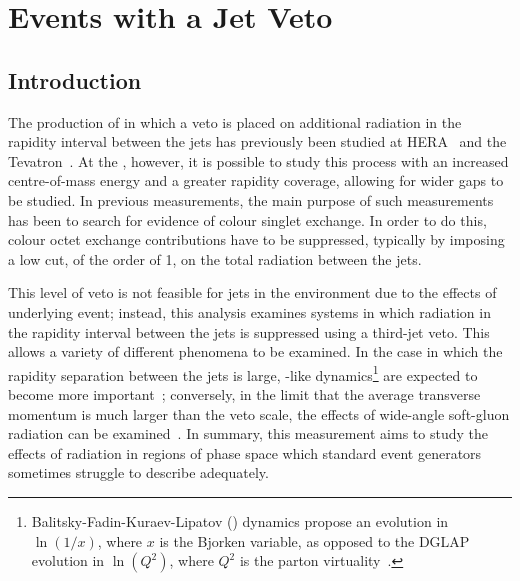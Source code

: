 \chapter{\Dijet Events with a Jet Veto}
\label{chap:gbj}


\section{Introduction}
The production of  in which a veto is placed on additional radiation in
the rapidity interval between the jets has previously been studied at HERA~\cite{ZEUS:1996:RapidityGaps,HERA:2002:RapidityGaps,ZEUS:2006:RapidityGaps}
and the Tevatron~\cite{D0:1994:RapidityGaps,CDF:1995:RapidityGaps,CDF:1998:RapidityGaps,D0:1998:ColorSinglet,CDF:1998:ColorSinglet}.
At the \LHC, however, it is possible to study this process with an increased centre-of-mass
energy and a greater rapidity coverage, allowing for wider gaps to be studied. In
previous measurements, the main purpose of such measurements has been to search for evidence of colour
singlet exchange. In order to do this, colour octet exchange contributions have to
be suppressed, typically by imposing a low cut, of the order of \unit{1}{\GeV},
on the total radiation between the jets.

This level of veto is not feasible for jets in the \ATLAS environment due to the effects of underlying event;
instead, this analysis examines \dijet systems in which radiation in the rapidity interval between the
jets is suppressed using a third-jet veto. This allows a variety of different \QCD
phenomena to be examined. In the case in which the rapidity separation between the
jets is large, \BFKL-like dynamics\footnote{Balitsky-Fadin-Kuraev-Lipatov (\BFKL) dynamics propose an evolution
in $\ln{(1/x)}$, where $x$ is the Bjorken variable, as opposed to the DGLAP
evolution in $\ln{(Q^2)}$, where $Q^2$ is the parton virtuality~\cite{Kuraev:1977:BFKL,Balitsky:1978:BFKL}.} are expected
to become more important~\cite{Andersen:2010:AllOrderCorrections,Andersen:2010:MultipleHardJets,Forshaw:2005:GapsBetweenJets};
conversely, in the limit that the average \dijet transverse momentum is much
larger than the veto scale, the effects of wide-angle soft-gluon radiation can be
examined~\cite{Forshaw:2006:SuperLeadingLogs,Forshaw:2009:JetVeto}. In summary,
this measurement aims to study the effects of \QCD radiation in regions of phase
space which standard event generators sometimes struggle to describe adequately.

